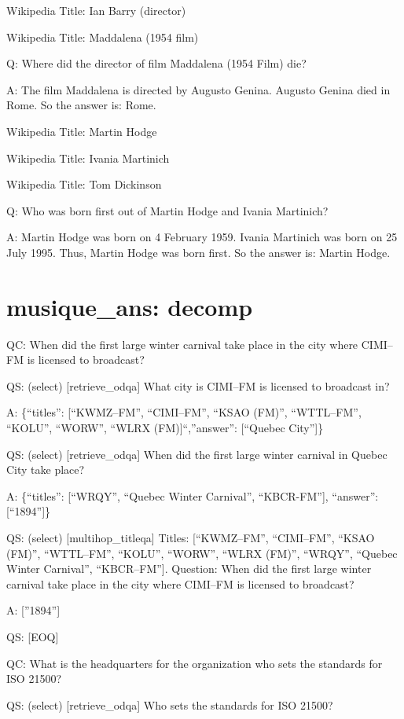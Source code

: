 \documentclass[
]{article}
\begin{document}
Wikipedia Title: Ian Barry (director)

Wikipedia Title: Maddalena (1954 film)

Q: Where did the director of film Maddalena (1954 Film) die?

A: The film Maddalena is directed by Augusto Genina. Augusto Genina died
in Rome. So the answer is: Rome.

Wikipedia Title: Martin Hodge

Wikipedia Title: Ivania Martinich

Wikipedia Title: Tom Dickinson

Q: Who was born first out of Martin Hodge and Ivania Martinich?

A: Martin Hodge was born on 4 February 1959. Ivania Martinich was born
on 25 July 1995. Thus, Martin Hodge was born first. So the answer is:
Martin Hodge.

\section{musique\_ans: decomp}\label{musique_ans-decomp}

QC: When did the first large winter carnival take place in the city
where CIMI--FM is licensed to broadcast?

QS: (select) {[}retrieve\_odqa{]} What city is CIMI--FM is licensed to
broadcast in?

A: \{``titles'': {[}``KWMZ--FM'', ``CIMI--FM'', ``KSAO (FM)'',
``WTTL--FM'', ``KOLU'', ``WORW'', ``WLRX (FM){]}``,''answer'':
{[}``Quebec City''{]}\}

QS: (select) {[}retrieve\_odqa{]} When did the first large winter
carnival in Quebec City take place?

A: \{``titles'': {[}``WRQY'', ``Quebec Winter Carnival'',
``KBCR-FM''{]}, ``answer'': {[}``1894''{]}\}

QS: (select) {[}multihop\_titleqa{]} Titles: {[}``KWMZ--FM'',
``CIMI--FM'', ``KSAO (FM)'', ``WTTL--FM'', ``KOLU'', ``WORW'', ``WLRX
(FM)'', ``WRQY'', ``Quebec Winter Carnival'', ``KBCR--FM''{]}. Question:
When did the first large winter carnival take place in the city where
CIMI--FM is licensed to broadcast?

A: {[}''1894''{]}

QS: {[}EOQ{]}

QC: What is the headquarters for the organization who sets the standards
for ISO 21500?

QS: (select) {[}retrieve\_odqa{]} Who sets the standards for ISO 21500?
\end{document}

